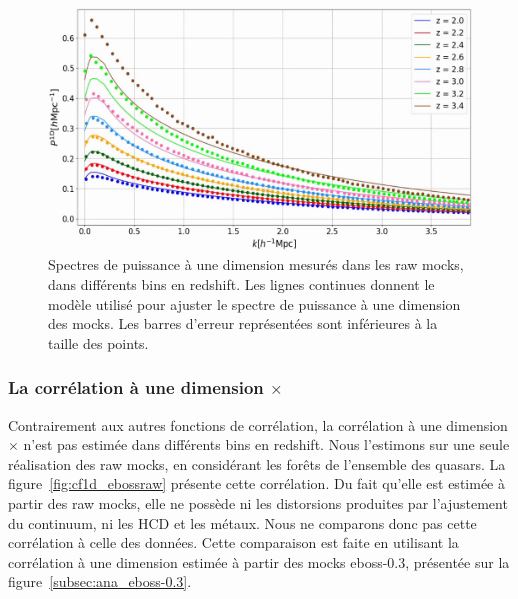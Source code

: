 \begin{figure}
  \centering
  \includegraphics[scale=0.45]{p1d_ebossraw}
  \caption{Spectres de puissance à une dimension mesurés dans les raw mocks, dans différents bins en redshift. Les lignes continues donnent le modèle utilisé pour ajuster le spectre de puissance à une dimension des mocks. Les barres d'erreur représentées sont inférieures à la taille des points.}
  \label{fig:p1d_ebossraw}
\end{figure}


\subsubsection{La corrélation à une dimension \lya{}$\times$\lya{}}
Contrairement aux autres fonctions de corrélation, la corrélation à une dimension \lya{}$\times$\lya{} n'est pas estimée dans différents bins en redshift. Nous l'estimons sur une seule réalisation des raw mocks, en considérant les forêts de l'ensemble des quasars.
La figure~\ref{fig:cf1d_ebossraw} présente cette corrélation.
Du fait qu'elle est estimée à partir des raw mocks, elle ne possède ni les distorsions produites par l'ajustement du continuum, ni les HCD et les métaux. Nous ne comparons donc pas cette corrélation à celle des données. Cette comparaison est faite en utilisant la corrélation à une dimension estimée à partir des mocks eboss-0.3, présentée sur la figure~\ref{subsec:ana_eboss-0.3}.

